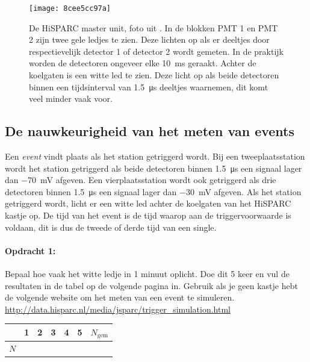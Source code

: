 \begin{figure}[ht]
    \centering
    \texttt{[image: 8cee5cc97a]}
    \caption{De HiSPARC master unit, foto uit \cite{nikhefhisparc}. In de
             blokken PMT 1 en PMT 2 zijn twee gele ledjes te zien. Deze
             lichten op als er deeltjes door respectievelijk detector 1
             of detector 2 wordt gemeten. In de praktijk worden de
             detectoren ongeveer elke \SI{10}{\milli\second} geraakt.
             Achter de koelgaten is een witte led te zien. Deze licht op
             als beide detectoren binnen een tijdsinterval van
             \SI{1.5}{\micro\second} deeltjes waarnemen, dit komt veel
             minder vaak voor.}
\end{figure}


\subsection{De nauwkeurigheid van het meten van events}

Een \emph{event} vindt plaats als het station getriggerd wordt.
Bij een tweeplaatsstation wordt het station getriggerd als beide detectoren
binnen \SI{1,5}{\micro\second} een signaal lager dan \SI{-70}{\milli\volt}
afgeven. Een vierplaatsstation wordt ook getriggerd als drie detectoren
binnen \SI{1,5}{\micro\second} een signaal lager dan \SI{-30}{\milli\volt}
afgeven. Als het station getriggerd wordt, licht er een witte led
achter de koelgaten van het HiSPARC kastje op. De tijd van het event
is de tijd waarop aan de triggervoorwaarde is voldaan, dit is dus
de tweede of derde tijd van een single.

\begin{minipage}[t]{1\columnwidth}%

\paragraph{Opdracht 1:}

Bepaal hoe vaak het witte ledje in 1 minuut oplicht. Doe dit 5 keer
en vul de resultaten in de tabel op de volgende pagina in.
Gebruik als je geen \hisparc kastje hebt de volgende website om het
meten van een event te simuleren.\\
\url{http://data.hisparc.nl/media/jsparc/trigger_simulation.html}


\vspace{10px}
\begin{tabular}{|x{.11\textwidth}|x{.11\textwidth}|x{.11\textwidth}
                |x{.11\textwidth}|x{.11\textwidth}|x{.11\textwidth}
                |x{.11\textwidth}|}
     & 1 & 2 & 3 & 4 & 5 & $N_\textrm{gem}$\\
    \hline
    $N$ &  &  &  &  &  & \tabularnewline
    \hline
\end{tabular}%
\end{minipage}

